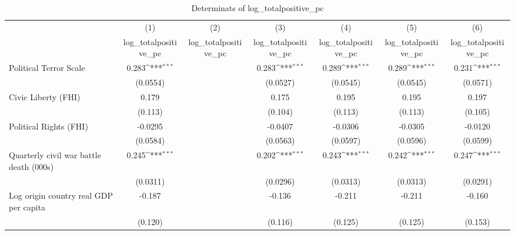 \begin{table}[htbp]\centering
\def\sym#1{\ifmmode^{#1}\else\(^{#1}\)\fi}
\caption{Determinats of log\_totalpositive\_pc}
\begin{tabular}{l*{6}{c}}
\hline\hline
                    &\multicolumn{1}{c}{(1)}&\multicolumn{1}{c}{(2)}&\multicolumn{1}{c}{(3)}&\multicolumn{1}{c}{(4)}&\multicolumn{1}{c}{(5)}&\multicolumn{1}{c}{(6)}\\
                    &\multicolumn{1}{c}{log\_totalpositive\_pc}&\multicolumn{1}{c}{log\_totalpositive\_pc}&\multicolumn{1}{c}{log\_totalpositive\_pc}&\multicolumn{1}{c}{log\_totalpositive\_pc}&\multicolumn{1}{c}{log\_totalpositive\_pc}&\multicolumn{1}{c}{log\_totalpositive\_pc}\\
\hline
Political Terror Scale&       0.283\sym{***}&                     &       0.283\sym{***}&       0.289\sym{***}&       0.289\sym{***}&       0.231\sym{***}\\
                    &    (0.0554)         &                     &    (0.0527)         &    (0.0545)         &    (0.0545)         &    (0.0571)         \\
[1em]
Civic Liberty (FHI) &       0.179         &                     &       0.175         &       0.195         &       0.195         &       0.197         \\
                    &     (0.113)         &                     &     (0.104)         &     (0.113)         &     (0.113)         &     (0.105)         \\
[1em]
Political Rights (FHI)&     -0.0295         &                     &     -0.0407         &     -0.0306         &     -0.0305         &     -0.0120         \\
                    &    (0.0584)         &                     &    (0.0563)         &    (0.0597)         &    (0.0596)         &    (0.0599)         \\
[1em]
Quarterly civil war battle death (000s)&       0.245\sym{***}&                     &       0.202\sym{***}&       0.243\sym{***}&       0.242\sym{***}&       0.247\sym{***}\\
                    &    (0.0311)         &                     &    (0.0296)         &    (0.0313)         &    (0.0313)         &    (0.0291)         \\
[1em]
Log origin country real GDP per capita&      -0.187         &                     &      -0.136         &      -0.211         &      -0.211         &      -0.160         \\
                    &     (0.120)         &                     &     (0.116)         &     (0.125)         &     (0.125)         &     (0.153)         \\

\end{tabular}
\end{table}
